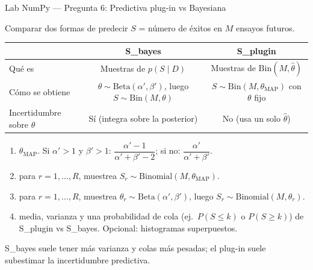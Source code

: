 \begin{frame}{Lab NumPy — Pregunta 6: Predictiva plug-in vs Bayesiana}

 Comparar dos formas de predecir \(S\) = número de éxitos en \(M\) ensayos futuros.

\begin{center}
\renewcommand{\arraystretch}{1.2}
\begin{tabular}{lcc}
\toprule
 & \textbf{S\_bayes} & \textbf{S\_plugin} \\
\midrule
Qué es & Muestras de \(p(S\mid D)\) & Muestras de \(\mathrm{Bin}(M,\hat\theta)\) \\
Cómo se obtiene & \(\theta\sim\mathrm{Beta}(\alpha',\beta')\), luego \(S\sim\mathrm{Bin}(M,\theta)\) & \(S\sim\mathrm{Bin}(M,\theta_{\mathrm{MAP}})\) con \(\theta\) fijo \\
Incertidumbre sobre \(\theta\) & Sí (integra sobre la posterior) & No (usa un solo \(\hat\theta\)) \\
\bottomrule
\end{tabular}
\end{center}

\vspace{0.5em}
\begin{enumerate}
  \item {} \(\theta_{\mathrm{MAP}}\). Si \(\alpha'>1\) y \(\beta'>1\): \(\dfrac{\alpha'-1}{\alpha'+\beta'-2}\); si no: \(\dfrac{\alpha'}{\alpha'+\beta'}\).
  \item {} para \(r=1,\ldots,R\), muestrea \(S_r \sim \mathrm{Binomial}(M,\theta_{\mathrm{MAP}})\).
  \item {} para \(r=1,\ldots,R\), muestrea \(\theta_r\sim\mathrm{Beta}(\alpha',\beta')\), luego \(S_r\sim\mathrm{Binomial}(M,\theta_r)\).
  \item {} media, varianza y una probabilidad de cola (ej.\ \(P(S\le k)\) o \(P(S\ge k)\)) de S\_plugin vs S\_bayes. Opcional: histogramas superpuestos.
\end{enumerate}

\small
{} S\_bayes suele tener más varianza y colas más pesadas; el plug-in suele subestimar la incertidumbre predictiva.
\end{frame}

